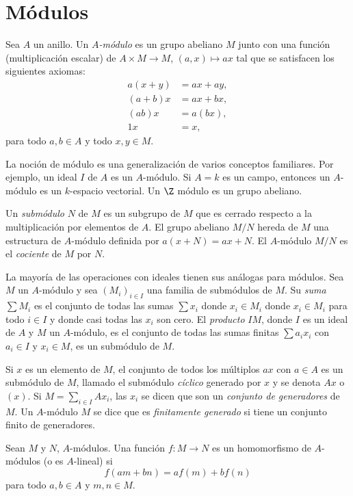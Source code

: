 \section{Módulos}

Sea $A$ un anillo. Un \emph{$A$-módulo} es un grupo abeliano $M$ junto con una función (multiplicación escalar) de $A\times M \to M$, $(a,x) \mapsto ax$ tal que se satisfacen los siguientes axiomas:
\begin{align*}
  a(x+y) &= ax + ay, \\
  (a+b)x &= ax + bx, \\
  (ab)x &= a(bx), \\
  1x &= x,
\end{align*}
para todo $a,b \in A$ y todo $x,y \in M$.

La noción de módulo es una generalización de varios conceptos familiares. Por ejemplo, un ideal $I$ de $A$ es un $A$-módulo. Si $A = k$ es un campo, entonces un $A$-módulo es un $k$-espacio vectorial. Un $\Z$ módulo es un grupo abeliano.

Un \emph{submódulo} $N$ de $M$ es un subgrupo de $M$ que es cerrado respecto a la multiplicación por elementos de $A$. El grupo abeliano $M/N$ hereda de $M$ una estructura de $A$-módulo definida por $a(x+N) = ax + N$. El $A$-módulo $M/N$ es el \emph{cociente} de $M$ por $N$.

La mayoría de las operaciones con ideales tienen sus análogas para módulos. Sea $M$ un $A$-módulo y sea $(M_i)_{i\in I}$ una familia de submódulos de $M$. Su \emph{suma} $\sum M_i$ es el conjunto de todas las sumas $\sum x_i$ donde $x_i \in M_i$ donde $x_i \in M_i$ para todo $i \in I$ y donde casi todas las $x_i$ son cero. El \emph{producto} $IM$, donde $I$ es un ideal de $A$ y $M$ un $A$-módulo, es el conjunto de todas las sumas finitas $\sum a_i x_i$ con $a_i \in I$ y $x_i \in M$, es un submódulo de $M$.

Si $x$ es un elemento de $M$, el conjunto de todos los múltiplos $ax$ con $a \in A$ es un submódulo de $M$, llamado el submódulo \emph{cíclico} generado por $x$ y se denota $Ax$ o $(x)$. Si $M = \sum_{i \in I} A x_i$, las $x_i$ se dicen que son un \emph{conjunto de generadores} de $M$. Un $A$-módulo $M$ se dice que es \emph{finitamente generado} si tiene un conjunto finito de generadores.

\begin{definition}
  Sean $M$ y $N$, $A$-módulos. Una función $f\colon M \to N $ es un homomorfismo de $A$-módulos (o es $A$-lineal) si 
    \[
      f(am+bn) = af(m) + bf(n)
    \]
  para todo $a,b \in A$ y $m,n \in M$.
\end{definition}

